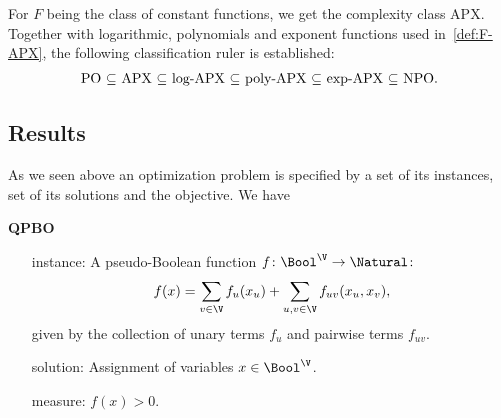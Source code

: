 For $F$ being the class of constant functions, we get the complexity class APX. Together with logarithmic, polynomials and exponent functions used in~\cref{def:F-APX}, the following classification ruler is established:
\begin{align}\notag                                                                                                                                                          
\mbox{PO $\subseteq$ APX $\subseteq$ log-APX $\subseteq$ poly-APX $\subseteq$ exp-APX $\subseteq$ NPO}.
\end{align}


\subsection{Results}
As we seen above an optimization problem is specified by a set of its instances, set of its solutions and the objective. We have
\begin{problem}{\bf QPBO}
\begin{itemize}
\item[\sc instance:] A pseudo-Boolean function $f \colon \Bool^\V \to \Natural \colon$
\begin{align}
f(x) = \sum_{v\in\V} f_u(x_u) + \sum_{u,v\in\V} f_{uv}(x_u,x_v),
\end{align}
given by the collection of unary terms $f_u$ and pairwise terms $f_{uv}$.
\item[\sc solution:] Assignment of variables $x \in \Bool^\V$.
\item[\sc measure:] $f(x) > 0$.
\end{itemize}
\end{problem}


